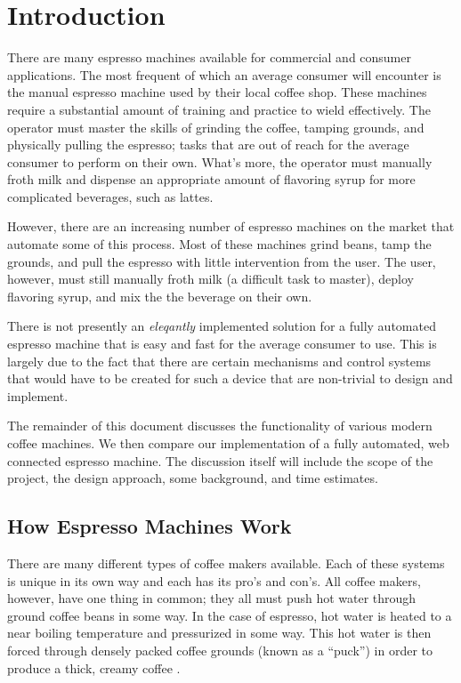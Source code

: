 \documentclass[conference]{IEEEtran}
\begin{document}
%
\section{Introduction} 

There are many espresso machines available for commercial and
consumer applications. The most frequent of which an average consumer will
encounter is the manual espresso machine used by their local coffee shop. These
machines require a substantial amount of training and practice to wield
effectively. The operator must master the skills of grinding the coffee, tamping
grounds, and physically pulling the espresso; tasks that are out of reach for
the average consumer to perform on their own. What's more, the operator must
manually froth milk and dispense an appropriate amount of flavoring syrup for more
complicated beverages, such as lattes.

However, there are an increasing number of espresso machines on the market that
automate some of this process.  Most of these machines grind beans, tamp the
grounds, and pull the espresso with little intervention from the user. The user,
however, must still manually froth milk (a difficult task to master), deploy
flavoring syrup, and mix the the beverage on their own.
 
There is not presently an \emph{eleqantly} implemented solution for a fully
automated espresso machine that is easy and fast for the average consumer
to use. This is largely due to the fact that there are certain mechanisms and
control systems that would have to be created for such a device that are
non-trivial to design and implement.

The remainder of this document discusses the functionality of various 
modern coffee machines. We then compare our implementation of a fully
automated, web connected espresso machine. The discussion itself will
include the scope of the project, the design approach, some background, 
and time estimates. 

\subsection{How Espresso Machines Work}

There are many different types of coffee makers available. Each of these systems
is unique in its own way and each has its pro's and con's. All coffee makers,
however, have one thing in common; they all must push hot water through ground
coffee beans in some way. In the case of espresso, hot water is heated to a near
boiling temperature and pressurized in some way. This hot water is then forced
through densely packed coffee grounds (known as a ``puck'') in order to produce
a thick, creamy coffee \cite{wikiespresso}.  
\end{document}
